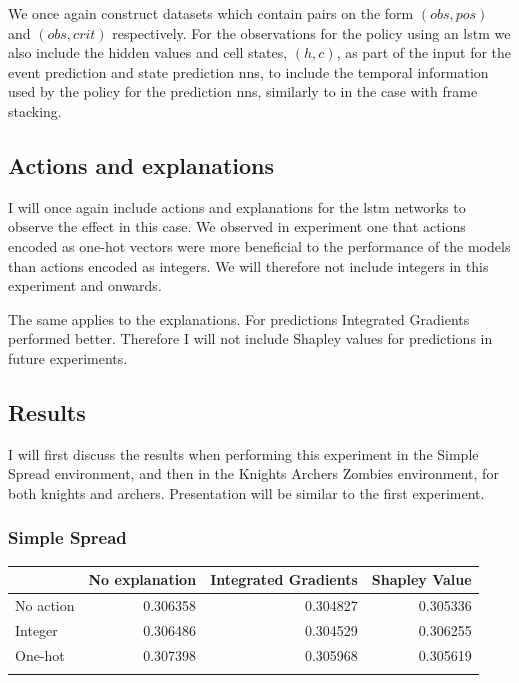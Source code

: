 \documentclass[UKenglish]{uiomasterthesis}
\begin{document}
We once again construct datasets which contain pairs on the form $(obs, pos)$ and $(obs, crit)$ respectively. For the observations for the policy using an \ac{lstm} we also include the hidden values and cell states, $(h,c)$, as part of the input for the event prediction and state prediction \acp{nn}, to include the temporal information used by the policy for the prediction \acp{nn}, similarly to in the case with frame stacking.

\subsection{Actions and explanations}
I will once again include actions and explanations for the \ac{lstm} networks to observe the effect in this case. We observed in experiment one that actions encoded as one-hot vectors were more beneficial to the performance of the models than actions encoded as integers. We will therefore not include integers in this experiment and onwards.

The same applies to the explanations. For predictions Integrated Gradients performed better. Therefore I will not include Shapley values for predictions in future experiments.

\subsection{Results}
I will first discuss the results when performing this experiment in the Simple Spread environment, and then in the Knights Archers Zombies environment, for both knights and archers. Presentation will be similar to the first experiment.

\subsubsection{Simple Spread}

\begin{center}
\label{tab:state_simpl_lstm}
\begin{tabular}{lrrr}
\toprule
 & No explanation & Integrated Gradients & Shapley Value \\
\midrule
No action & 0.306358 & 0.304827 & 0.305336 \\
Integer & 0.306486 & 0.304529 & 0.306255 \\
One-hot & 0.307398 & 0.305968 & 0.305619 \\
\bottomrule
\addlinespace[2pt]
\end{tabular}
\end{center}
\end{document}
